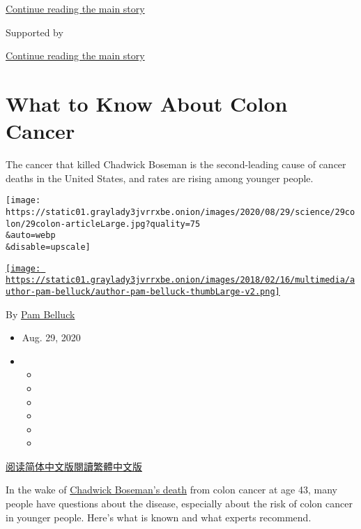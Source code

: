 \protect\hyperlink{after-top}{Continue reading the main story}

Supported by

\protect\hyperlink{after-sponsor}{Continue reading the main story}

\hypertarget{what-to-know-about-colon-cancer}{%
\section{What to Know About Colon
Cancer}\label{what-to-know-about-colon-cancer}}

The cancer that killed Chadwick Boseman is the second-leading cause of
cancer deaths in the United States, and rates are rising among younger
people.

\texttt{[image: https://static01.graylady3jvrrxbe.onion/images/2020/08/29/science/29colon/29colon-articleLarge.jpg?quality=75\\\&auto=webp\\\&disable=upscale]}

\href{https://www.nytimes3xbfgragh.onion/by/pam-belluck}{\texttt{[image: https://static01.graylady3jvrrxbe.onion/images/2018/02/16/multimedia/author-pam-belluck/author-pam-belluck-thumbLarge-v2.png]}}

By \href{https://www.nytimes3xbfgragh.onion/by/pam-belluck}{Pam Belluck}

\begin{itemize}
\item
  Aug. 29, 2020
\item
  \begin{itemize}
  \item
  \item
  \item
  \item
  \item
  \item
  \end{itemize}
\end{itemize}

\href{https://cn.nytimes3xbfgragh.onion/health/20200831/colon-cancer-chadwick-boseman/}{阅读简体中文版}\href{https://cn.nytimes3xbfgragh.onion/health/20200831/colon-cancer-chadwick-boseman/zh-hant/}{閱讀繁體中文版}

In the wake of
\href{https://www.nytimes3xbfgragh.onion/2020/08/28/movies/chadwick-boseman-dead.html}{Chadwick
Boseman's death} from colon cancer at age 43, many people have questions
about the disease, especially about the risk of colon cancer in younger
people. Here's what is known and what experts recommend.


